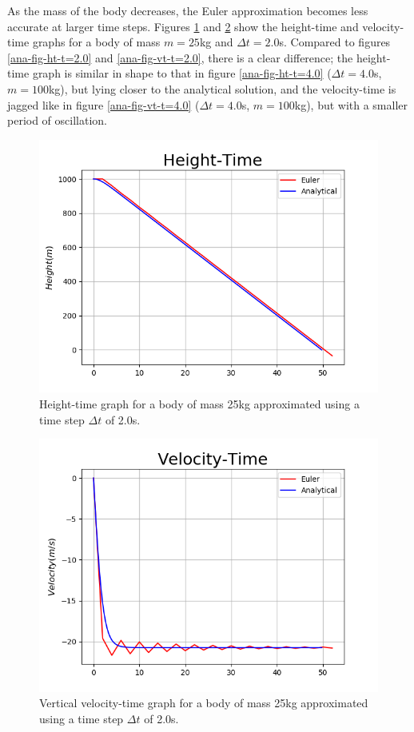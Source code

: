 \documentclass[twocolumn,prl,nobalancelastpage,aps,10pt]{revtex4-1}
\begin{document}
As the mass of the body decreases, the Euler approximation becomes less accurate at larger time steps. Figures \ref{ana-fig-htm-t=2.0} and \ref{ana-fig-vtm-t=2.0} show the height-time and velocity-time graphs for a body of mass $m=25$kg and $\Delta t=2.0$s. Compared to figures \ref{ana-fig-ht-t=2.0} and \ref{ana-fig-vt-t=2.0}, there is a clear difference; the height-time graph is similar in shape to that in figure \ref{ana-fig-ht-t=4.0} ($\Delta t =4.0$s, $m=100$kg), but lying closer to the analytical solution, and the velocity-time is jagged like in figure \ref{ana-fig-vt-t=4.0} ($\Delta t =4.0$s, $m=100$kg), but with a smaller period of oscillation.
\begin{figure}
	\includegraphics*[width=0.96\linewidth,clip]{ana-fig-htm-t=20}
	\caption{Height-time graph for a body of mass 25kg approximated using a time step $\Delta t$ of  2.0s.}\label{ana-fig-htm-t=2.0}
\end{figure}
\begin{figure}
	\includegraphics*[width=0.96\linewidth,clip]{ana-fig-vtm-t=20}
	\caption{Vertical velocity-time graph for a body of mass 25kg approximated using a time step $\Delta t$ of  2.0s.}\label{ana-fig-vtm-t=2.0}
\end{figure}
\end{document}
